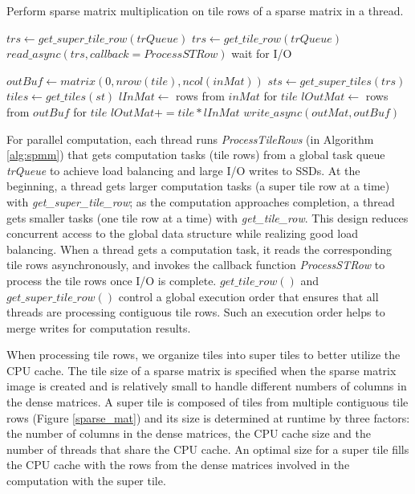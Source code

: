 \begin{algorithm}
	\caption{Perform sparse matrix multiplication on tile rows of a sparse
	matrix in a thread.}
	\label{alg:spmm}
	\begin{algorithmic}[1]
		\State $trs \gets get\_super\_tile\_row(trQueue)$
		\Else \State $trs \gets get\_tile\_row(trQueue)$
		\EndIf
		\State $read\_async(trs, callback=ProcessSTRow)$
		 \State wait for I/O
		\EndIf
		\EndWhile
		\EndProcedure

		\State

		\State $outBuf \gets matrix(0, nrow(tile), ncol(inMat))$
		\State $sts \gets get\_super\_tiles(trs)$
		\State $tiles \gets get\_tiles(st)$
		\State $lInMat \gets$ rows from $inMat$ for $tile$
		\State $lOutMat \gets$ rows from $outBuf$ for $tile$
		\State $lOutMat += tile * lInMat$
		\EndFor
		\EndFor
		\State $write\_async(outMat, outBuf)$
		\EndProcedure
	\end{algorithmic}
\end{algorithm}

For parallel computation, each thread runs \textit{ProcessTileRows} (in Algorithm
\ref{alg:spmm}) that gets computation tasks (tile rows) from a global task queue
\textit{trQueue} to achieve load balancing and large I/O writes to SSDs.
At the beginning, a thread gets larger computation tasks (a super tile row at
a time) with \textit{get\_super\_tile\_row}; as the computation approaches
completion, a thread gets smaller tasks (one tile row at a time) with
\textit{get\_tile\_row}. This design reduces concurrent access to
the global data structure while realizing good load balancing. When a thread
gets a computation task, it reads the corresponding tile rows asynchronously,
and invokes the callback function \textit{ProcessSTRow} to process the tile rows
once I/O is complete. $get\_tile\_row()$ and $get\_super\_tile\_row()$ control
a global execution order that ensures that all threads are processing contiguous
tile rows. Such an execution order helps to merge writes for computation results.

When processing tile rows, we organize tiles into super tiles to better utilize
the CPU cache. The tile size of a sparse
matrix is specified when the sparse matrix image is created and is relatively
small to handle different numbers of columns in the dense matrices. A super tile
is composed of tiles from multiple contiguous tile rows (Figure \ref{sparse_mat})
and its size is determined at runtime by three factors: the number of columns
in the dense matrices, the CPU cache size and the number of threads that
share the CPU cache. An optimal size for a super tile fills
the CPU cache with the rows from the dense matrices involved in
the computation with the super tile.

